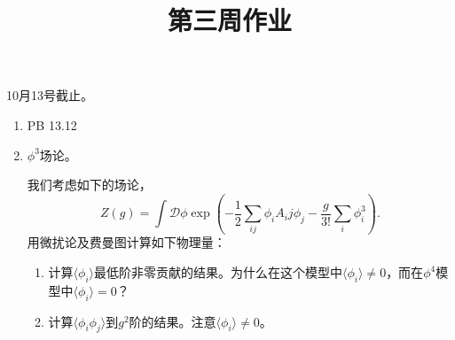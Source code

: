 \documentclass[12pt,aps,pra,notitlepage]{revtex4-1}
\begin{document}
\title{第三周作业}
\maketitle
\begin{center}
  10月13号截止。
\end{center}
\begin{enumerate}
  \item PB 13.12
  \item $\phi^3$场论。

  我们考虑如下的场论，
  \[Z(g)=\int\mathcal D\phi \exp\left(
  -\frac12\sum_{ij}\phi_iA_ij\phi_j-\frac g{3!}\sum_i\phi_i^3\right).\]
  用微扰论及费曼图计算如下物理量：
  \begin{enumerate}
    \item 计算$\langle\phi_i\rangle$最低阶非零贡献的结果。为什么在这个模型中$\langle\phi_i\rangle\neq0$，而在$\phi^4$模型中$\langle\phi_i\rangle=0$？
    \item 计算$\langle\phi_i\phi_j\rangle$到$g^2$阶的结果。注意$\langle\phi_i\rangle\neq0$。
  \end{enumerate}
\end{enumerate}
\end{document}
